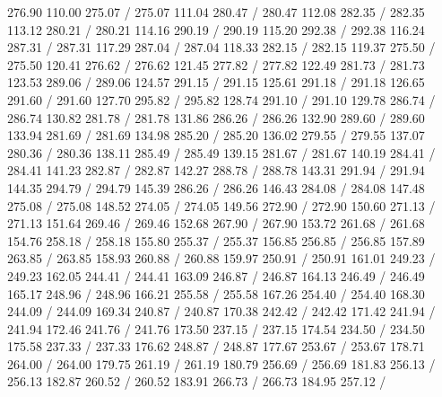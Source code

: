 { 276.90 110.00 275.07 /
 275.07 111.04 280.47 /
 280.47 112.08 282.35 /
 282.35 113.12 280.21 /
 280.21 114.16 290.19 /
 290.19 115.20 292.38 /
 292.38 116.24 287.31 /
 287.31 117.29 287.04 /
 287.04 118.33 282.15 /
 282.15 119.37 275.50 /
 275.50 120.41 276.62 /
 276.62 121.45 277.82 /
 277.82 122.49 281.73 /
 281.73 123.53 289.06 /
 289.06 124.57 291.15 /
 291.15 125.61 291.18 /
 291.18 126.65 291.60 /
 291.60 127.70 295.82 /
 295.82 128.74 291.10 /
 291.10 129.78 286.74 /
 286.74 130.82 281.78 /
 281.78 131.86 286.26 /
 286.26 132.90 289.60 /
 289.60 133.94 281.69 /
 281.69 134.98 285.20 /
 285.20 136.02 279.55 /
 279.55 137.07 280.36 /
 280.36 138.11 285.49 /
 285.49 139.15 281.67 /
 281.67 140.19 284.41 /
 284.41 141.23 282.87 /
 282.87 142.27 288.78 /
 288.78 143.31 291.94 /
 291.94 144.35 294.79 /
 294.79 145.39 286.26 /
 286.26 146.43 284.08 /
 284.08 147.48 275.08 /
 275.08 148.52 274.05 /
 274.05 149.56 272.90 /
 272.90 150.60 271.13 /
 271.13 151.64 269.46 /
 269.46 152.68 267.90 /
 267.90 153.72 261.68 /
 261.68 154.76 258.18 /
 258.18 155.80 255.37 /
 255.37 156.85 256.85 /
 256.85 157.89 263.85 /
 263.85 158.93 260.88 /
 260.88 159.97 250.91 /
 250.91 161.01 249.23 /
 249.23 162.05 244.41 /
 244.41 163.09 246.87 /
 246.87 164.13 246.49 /
 246.49 165.17 248.96 /
 248.96 166.21 255.58 /
 255.58 167.26 254.40 /
 254.40 168.30 244.09 /
 244.09 169.34 240.87 /
 240.87 170.38 242.42 /
 242.42 171.42 241.94 /
 241.94 172.46 241.76 /
 241.76 173.50 237.15 /
 237.15 174.54 234.50 /
 234.50 175.58 237.33 /
 237.33 176.62 248.87 /
 248.87 177.67 253.67 /
 253.67 178.71 264.00 /
 264.00 179.75 261.19 /
 261.19 180.79 256.69 /
 256.69 181.83 256.13 /
 256.13 182.87 260.52 /
 260.52 183.91 266.73 /
 266.73 184.95 257.12 /
}
